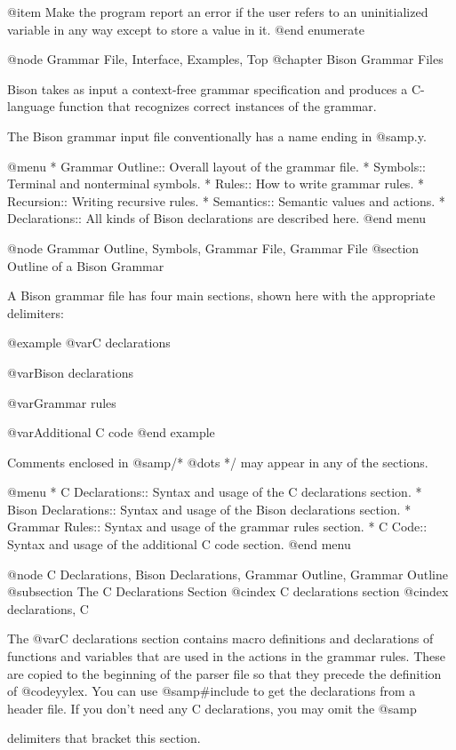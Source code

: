 {{{{{{{{{{{{{{@item
Make the program report an error if the user refers to an
uninitialized variable in any way except to store a value in it.
@end enumerate

@node Grammar File, Interface, Examples, Top
@chapter Bison Grammar Files

Bison takes as input a context-free grammar specification and produces a
C-language function that recognizes correct instances of the grammar.

The Bison grammar input file conventionally has a name ending in @samp{.y}.

@menu
* Grammar Outline::    Overall layout of the grammar file.
* Symbols::            Terminal and nonterminal symbols.
* Rules::              How to write grammar rules.
* Recursion::	       Writing recursive rules.
* Semantics::          Semantic values and actions.
* Declarations::       All kinds of Bison declarations are described here.
@end menu

@node Grammar Outline, Symbols, Grammar File, Grammar File
@section Outline of a Bison Grammar

A Bison grammar file has four main sections, shown here with the
appropriate delimiters:

@example
@var{C declarations}

@var{Bison declarations}

@var{Grammar rules}

@var{Additional C code}
@end example

Comments enclosed in @samp{/* @dots{} */} may appear in any of the sections.

@menu
* C Declarations::      Syntax and usage of the C declarations section.
* Bison Declarations::  Syntax and usage of the Bison declarations section.
* Grammar Rules::       Syntax and usage of the grammar rules section.
* C Code::              Syntax and usage of the additional C code section.
@end menu

@node C Declarations, Bison Declarations, Grammar Outline, Grammar Outline
@subsection The C Declarations Section
@cindex C declarations section
@cindex declarations, C

The @var{C declarations} section contains macro definitions and
declarations of functions and variables that are used in the actions in the
grammar rules.  These are copied to the beginning of the parser file so
that they precede the definition of @code{yylex}.  You can use
@samp{#include} to get the declarations from a header file.  If you don't
need any C declarations, you may omit the @samp{%
delimiters that bracket this section.

}}}}}}}}}}}}}}}
